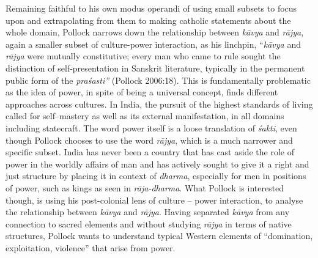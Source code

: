 Remaining faithful to his own modus operandi of using small subsets to focus upon and extrapolating from them to making catholic statements about the whole domain, Pollock narrows down the relationship between \textit{kāvya} and \textit{rājya}, again a smaller subset of culture-power interaction, as his linchpin, “\textit{kāvya} and \textit{rājya} were mutually constitutive; every man who came to rule sought the distinction of self-presentation in Sanskrit literature, typically in the permanent public form of the \textit{praśasti”} (Pollock 2006:18). This is fundamentally problematic as the idea of power, in spite of being a universal concept, finds different approaches across cultures. In India, the pursuit of the highest standards of living called for self–mastery as well as its external manifestation, in all domains including statecraft. The word power itself is a loose translation of \textit{śakti}, even though Pollock chooses to use the word \textit{rājya}, which is a much narrower and specific subset. India has never been a country that has cast aside the role of power in the worldly affairs of man and has actively sought to give it a right and just structure by placing it in context of \textit{dharma}, especially for men in positions of power, such as kings as seen in \textit{rāja-dharma}. What Pollock is interested though, is using his post-colonial lens of culture – power interaction, to analyse the relationship between \textit{kāvya} and \textit{rājya}. Having separated \textit{kāvya} from any connection to sacred elements and without studying \textit{rājya} in terms of native structures, Pollock wants to understand typical Western elements of “domination, exploitation, violence” that arise from power. 

